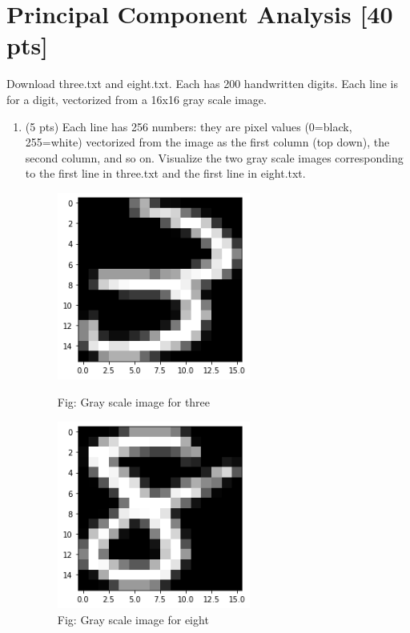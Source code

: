 \documentclass[a4paper]{article}
\theoremstyle{definition}
\newenvironment{soln}{
    \leavevmode\color{blue}\ignorespaces
}{}
\begin{document}
\section{Principal Component Analysis [40 pts]}
Download three.txt and eight.txt.  Each has 200 handwritten digits.  Each line is for a digit, vectorized from a 16x16 gray scale image.  
\begin{enumerate}
\item (5 pts) Each line has 256 numbers: they are pixel values (0=black, 255=white) vectorized from the image as the first column (top down), the second column, and so on.
Visualize the two gray scale images corresponding to the first line in three.txt and the first line in eight.txt.

\begin{soln}
	
	\begin{figure}[h!]
	        \centering
	        \includegraphics[width=0.6\textwidth]{Ans1_3_img.png} 
	        \captionsetup{labelformat=empty}
	        \caption{Fig: Gray scale image for three}
	        \label{fig:Gray scale image for three}



	        \includegraphics[width=0.6\textwidth]{Ans1_8_img.png} 
	        \captionsetup{labelformat=empty}
	        \caption{Fig: Gray scale image for eight}
	        \label{fig:Gray scale image for eight}


\end{figure}
\end{soln}
\end{enumerate}
\end{document}
